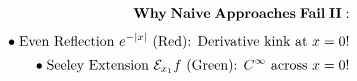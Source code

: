 \documentclass[preview]{standalone}
\begin{document}
\begin{align*}
\special{dvisvgm:raw <g id='unique000'>}\mathbf{Why\;Naive\;Approaches\;Fail\;II:}\\[3pt]\bullet\;\text{Even Reflection }e^{-|x|}\text{ (Red): Derivative kink at }x=0!\\[2pt]\bullet\;\text{Seeley Extension }\mathcal{E}_{x_1}f\text{ (Green): }C^\infty\text{ across }x=0!\special{dvisvgm:raw </g>}
\end{align*}
\end{document}
